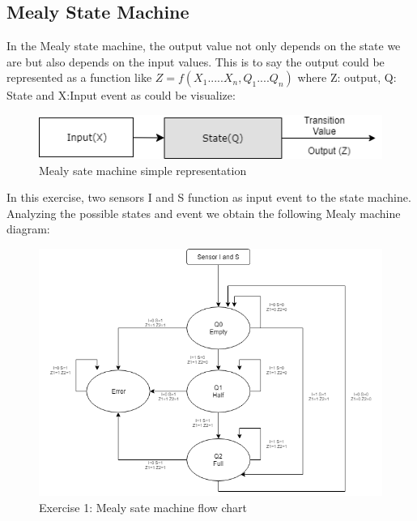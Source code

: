 %

%

%
%
%



\subsection{\color{purple}Mealy State Machine}

In the Mealy state machine, the output value not only depends on the state we are but also depends on the input values. This is to say the output could be represented as a function like $Z=f(X_1.....X_n,Q_1....Q_n)$ where Z: output, Q: State and X:Input event as could be visualize:

 \begin{figure}[H]
        \centering
        \includegraphics[scale=0.75]{../Exercise1/Mealy/mealydiagram.png}
        \caption{\color{cyan}Mealy sate machine simple representation}
        \label{fig:ej1mealyr}
    \end{figure}

In this exercise, two sensors I and S function as input event to the state machine. Analyzing the possible states and event we obtain the following Mealy machine diagram:

 \begin{figure}[H]
        \centering
        \includegraphics[scale=0.65]{../Exercise1/Mealy/ej1mealy.png}
        \caption{\color{cyan}Exercise 1: Mealy sate machine flow chart}
        \label{fig:ej1mealyd}
    \end{figure}

